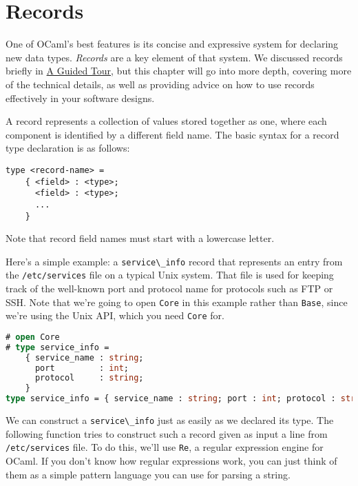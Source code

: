 \hypertarget{records}{%
\section{Records}\label{records}}

One of OCaml's best features is its concise and expressive system for
declaring new data types. \emph{Records} are a key element of that
system. We discussed records briefly in
\href{guided-tour.html\#a-guided-tour}{A Guided Tour}, but this chapter
will go into more depth, covering more of the technical details, as well
as providing advice on how to use records effectively in your software
designs.

A record represents a collection of values stored together as one, where
each component is identified by a different field name. The basic syntax
for a record type declaration is as follows:

\begin{lstlisting}
type <record-name> =
    { <field> : <type>;
      <field> : <type>;
      ...
    }
\end{lstlisting}

Note that record field names must start with a lowercase letter.

Here's a simple example: a \passthrough{\lstinline!service\_info!}
record that represents an entry from the
\passthrough{\lstinline!/etc/services!} file on a typical Unix system.
That file is used for keeping track of the well-known port and protocol
name for protocols such as FTP or SSH. Note that we're going to open
\passthrough{\lstinline!Core!} in this example rather than
\passthrough{\lstinline!Base!}, since we're using the Unix API, which
you need \passthrough{\lstinline!Core!} for.

\begin{lstlisting}[language=Caml]
# open Core
# type service_info =
    { service_name : string;
      port         : int;
      protocol     : string;
    }
type service_info = { service_name : string; port : int; protocol : string; }
\end{lstlisting}

We can construct a \passthrough{\lstinline!service\_info!} just as
easily as we declared its type. The following function tries to
construct such a record given as input a line from
\passthrough{\lstinline!/etc/services!} file. To do this, we'll use
\passthrough{\lstinline!Re!}, a regular expression engine for OCaml. If
you don't know how regular expressions work, you can just think of them
as a simple pattern language you can use for parsing a string.


